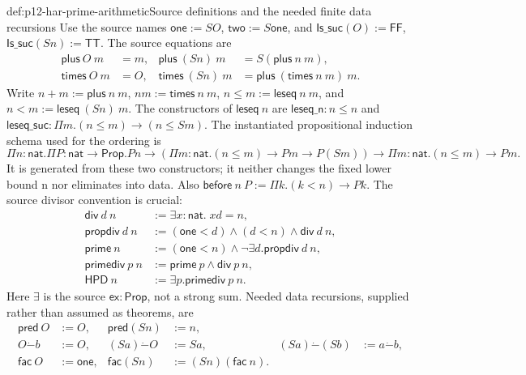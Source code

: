 \begin{hbdefinition}{def:p12-har-prime-arithmetic}{Source definitions and the needed finite data recursions}
Use the source names \(\mathsf{one}:=S O\), \(\mathsf{two}:=S\mathsf{one}\),
and \(\mathsf{Is\_suc}(O):=\mathsf{FF}\),
\(\mathsf{Is\_suc}(S n):=\mathsf{TT}\). The source equations are
\[
\begin{aligned}
 \mathsf{plus}\ O\ m&=m,& \mathsf{plus}\ (S n)\ m&=S(\mathsf{plus}\ n\ m),\\
 \mathsf{times}\ O\ m&=O,& \mathsf{times}\ (S n)\ m&=
               \mathsf{plus}\ (\mathsf{times}\ n\ m)\ m.
\end{aligned}
\]
Write \(n+m:=\mathsf{plus}\ n\ m\), \(nm:=\mathsf{times}\ n\ m\),
\(n\le m:=\mathsf{leseq}\ n\ m\), and
\(n<m:=\mathsf{leseq}\ (S n)\ m\). The constructors of
\(\mathsf{leseq}\ n\) are \(\mathsf{leseq\_n}:n\le n\) and
\(\mathsf{leseq\_suc}:\Pi m.(n\le m)\to(n\le S m)\).
The instantiated propositional induction schema used for the ordering is
\[
 \Pi n:\mathsf{nat}.\Pi P:\mathsf{nat}\to\mathsf{Prop}.
 P n\to(\Pi m:\mathsf{nat}.(n\le m)\to P m\to P(S m))\to
 \Pi m:\mathsf{nat}.(n\le m)\to P m.
\]
It is generated from these two constructors; it neither changes the
fixed lower bound n nor eliminates into data.
Also \(\mathsf{before}\ n\ P:=\Pi k.(k<n)\to P k\).
The source divisor convention is crucial:
\[
\begin{aligned}
 \mathsf{div}\ d\ n&:=\exists x:\mathsf{nat}.\;xd=n,\\
 \mathsf{propdiv}\ d\ n&:=(\mathsf{one}<d)\wedge(d<n)\wedge\mathsf{div}\ d\ n,\\
 \mathsf{prime}\ n&:=(\mathsf{one}<n)\wedge
                    \neg\exists d.\mathsf{propdiv}\ d\ n,\\
 \mathsf{primediv}\ p\ n&:=\mathsf{prime}\ p\wedge\mathsf{div}\ p\ n,\\
 \mathsf{HPD}\ n&:=\exists p.\mathsf{primediv}\ p\ n.
\end{aligned}
\]
Here \(\exists\) is the source \(\mathsf{ex}:\mathsf{Prop}\), not a
strong sum. Needed data recursions, supplied rather than assumed as
theorems, are
\[
\begin{aligned}
 \mathsf{pred}\ O&:=O,&\mathsf{pred}(S n)&:=n,\\
 O\mathbin{\dot{-}}b&:=O,&(S a)\mathbin{\dot{-}}O&:=S a,&
 (S a)\mathbin{\dot{-}}(S b)&:=a\mathbin{\dot{-}}b,\\
 \mathsf{fac}\ O&:=\mathsf{one},&\mathsf{fac}(S n)&:=(S n)(\mathsf{fac}\ n).
\end{aligned}
\]
\end{hbdefinition}
